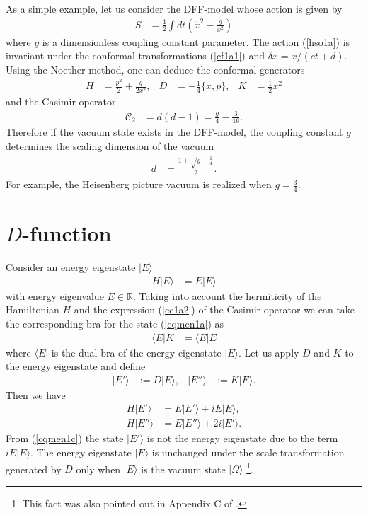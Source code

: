 \documentclass[12pt]{article}
\numberwithin{equation}{section}
\begin{document}
As a simple example, let us consider the DFF-model \cite{deAlfaro:1976je} 
whose action is given by
\begin{align}
\label{hso1a}
S&=\frac12 \int dt 
\left(\dot{x}^{2}-\frac{g}{x^{2}}\right)
\end{align}
where $g$ is a dimensionless coupling constant parameter. 
The action (\ref{hso1a}) is invariant under the conformal transformations 
(\ref{cf1a1}) and $\delta x=x/(ct+d)$. 
Using the Noether method, 
one can deduce the conformal generators 
\begin{align}
\label{dff1a1}
H&=\frac{p^{2}}{2}+\frac{g}{2x^{2}},& 
D&=-\frac14\{x,p\},& 
K&=\frac12 x^{2}
\end{align}
and the Casimir operator
\begin{align}
\label{hso1b}
\mathcal{C}_{2}&=d(d-1)
=\frac{g}{4}-\frac{3}{16}.
\end{align}
Therefore if the vacuum state exists in the DFF-model, 
the coupling constant $g$ determines the scaling dimension of the vacuum 
\begin{align}
\label{hso1c}
d&=\frac{1\pm\sqrt{g+\frac14}}{2}. 
\end{align} 
For example, the Heisenberg picture vacuum is realized when $g=\frac34$. 












%
%
%
\section{$D$-function}
\label{dsec}
Consider an energy eigenstate $|E\rangle$ 
\begin{align}
\label{cqmen1a}
H|E\rangle&=E|E\rangle
\end{align}
with energy eigenvalue $E\in \mathbb{R}$. 
Taking into account the hermiticity of the Hamiltonian $H$ 
and the expression (\ref{cc1a2}) of the Casimir operator 
we can take the corresponding bra for the state (\ref{cqmen1a}) as
\begin{align}
\label{cqmen1a1}
\langle E|K&=\langle E|E
\end{align}
where $\langle E|$ is the dual bra of the energy eigenstate $|E\rangle$. 
Let us apply $D$ and $K$ to the energy eigenstate and define
\begin{align}
\label{cqmen1b}
|E'\rangle&:=D|E\rangle,&  
|E''\rangle&:=K|E\rangle. 
\end{align}
Then we have
\begin{align}
\label{cqmen1c}
H|E'\rangle&=E|E'\rangle+iE|E\rangle,\\
\label{cqmen1d}
H|E''\rangle&=E|E''\rangle+2i|E'\rangle.
\end{align}
From (\ref{cqmen1c}) 
the state $|E'\rangle$ is not the energy eigenstate 
due to the term $iE|E\rangle$. 
The energy eigenstate $|E\rangle$ is unchanged under the scale transformation 
generated by $D$ only when $|E\rangle$ is the vacuum state $|\Omega\rangle$ 
\footnote{
This fact was also pointed out in Appendix C of \cite{Pal:2016rpz}. 
}. 
\end{document}
